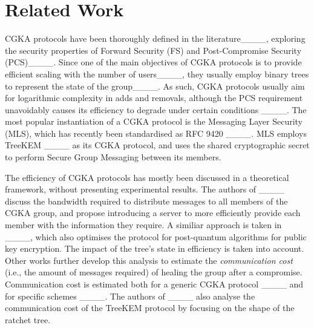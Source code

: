 \section{Related Work}
\label{sec:literature}

CGKA protocols have been thoroughly defined in the literature____, exploring the security properties of Forward Security (FS) and Post-Compromise Security (PCS)____. Since one of the main objectives of CGKA protocols is to provide efficient  scaling with the number of users____, they usually employ binary trees to represent the state of the group____. As such, CGKA protocols usually aim for logarithmic complexity in adds and removals, although the PCS requirement unavoidably causes its efficiency to degrade under certain conditions ____. The most popular instantiation of a CGKA protocol is the Messaging Layer Security (MLS), which has recently been standardised as RFC 9420 ____. MLS employs TreeKEM ____ as its CGKA protocol, and uses the shared cryptographic secret to perform Secure Group Messaging between its members.  


The efficiency of CGKA protocols has mostly been discussed in a theoretical framework, without presenting experimental results. The authors of ____ discuss the bandwidth required to distribute messages to all members of the CGKA group, and propose introducing a server to more efficiently provide each member with the information they require. A similiar approach is taken in ____, which also optimises the protocol for post-quantum algorithms for public key encryption. The impact of the tree's state in efficiency is taken into account. Other works further develop this analysis to estimate the \textit{communication cost} (i.e., the amount of messages required) of healing the group after a compromise. Communication cost is estimated both for a generic CGKA protocol ____ and for specific schemes ____. The authors of ____ also analyse the communication cost of the TreeKEM protocol by focusing on the shape of the ratchet tree.

